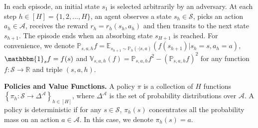 \documentclass{article}
\begin{document}
In each episode, an initial state $s_1$ is selected arbitrarily by an adversary. At each step $h \in [H]=\{1,2,...,H\} $, an agent observes a state $s_h \in \mathcal{S}$, picks an action $a_h \in \mathcal{A}$, receives the reward $r_h = r_h(s_h,a_h)$ and then transits to the next state $s_{h+1}$. The episode ends when an absorbing state $s_{H+1}$ is reached. For convenience, we denote $\mathbb { P }_{s,a,h}f = \mathbb{E}_{s_{h+1}\sim \mathbb{P}_h(\cdot|s,a)}(f(s_{h+1})|s_h=s,a_h=a)$, $\mathbbm { 1 }_s f = f(s)$ and  $\mathbb{V}_{s,a,h}(f) = \mathbb{P}_{s,a,h}f^2-(\mathbb{P}_{s,a,h}f)^2$ for any function $f: \mathcal{S} \rightarrow \mathbb{R}$ and triple $(s,a,h)$.

\textbf{Policies and Value Functions.}
	A policy $\pi$ is a collection of $H$ functions $\left\{\pi_h: \mathcal{S} \rightarrow \Delta^\mathcal{A}\right\}_{h \in[H]}$, where $\Delta^\mathcal{A}$ is the set of probability distributions over $\mathcal{A}$. A policy is deterministic if for any $s\in\mathcal{S}$,  $\pi_h(s)$ concentrates all the probability mass on an action $a\in\mathcal{A}$. In this case, we denote $\pi_h(s) = a$. 
    
\end{document}
